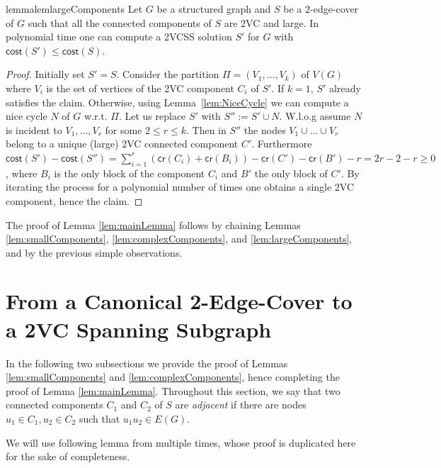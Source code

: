 \documentclass{theoretics}
\newcommand{\cost}{\mathsf{cost}}
\newcommand{\credit}{\mathsf{cr}}
\begin{document}
\begin{restatable}{lemma}{lemlargeComponents}\label{lem:largeComponents}
    Let $G$ be a structured graph and $S$ be a $2$-edge-cover of $G$ such that all the connected components of $S$ are 2VC and large. In polynomial time one can compute a 2VCSS solution $S'$ for $G$ with $\cost(S')\leq \cost(S)$.
\end{restatable}
\begin{proof}
    Initially set $S'=S$. Consider the partition $\Pi=(V_1,\ldots,V_k)$ of $V(G)$ where $V_i$ is the set of vertices of the 2VC component $C_i$ of $S'$. If $k=1$, $S'$ already satisfies the claim. Otherwise, using Lemma~\ref{lem:NiceCycle} we can compute a nice cycle $N$ of $G$ w.r.t. $\Pi$. Let us replace $S'$ with $S'':=S'\cup N$. W.l.o.g  assume $N$ is incident to $V_1,...,V_r$ for some $2\le r\le k$. Then in $S''$ the nodes   $V_1\cup \ldots \cup V_r$ belong to a unique (large) 2VC connected component $C'$. Furthermore $\cost(S')-\cost(S'')=\sum_{i=1}^r(\credit(C_i)+\credit(B_i))-\credit(C')-\credit(B')-r=2r-2-r\ge 0$, where $B_i$ is the only block of the component $C_i$ and $B'$ the only block of $C'$. By iterating the process for a polynomial number of times one obtains a single 2VC component, hence the claim.
\end{proof}

The proof of Lemma \ref{lem:mainLemma} follows by chaining Lemmas \ref{lem:smallComponents}, \ref{lem:complexComponents}, and \ref{lem:largeComponents}, and by the previous simple observations.

\section{From a Canonical 2-Edge-Cover to a 2VC Spanning Subgraph}
\label{sec:2VCSS}

In the following two subsections we provide the proof of Lemmas \ref{lem:smallComponents} and \ref{lem:complexComponents}, hence completing the proof of Lemma \ref{lem:mainLemma}. Throughout this section, we say that two connected components $C_1$ and $C_2$ of $S$ are \emph{adjacent} if there are nodes $u_1\in C_1, u_2\in C_2$ such that $u_1u_2\in E(G)$.

We will use following lemma from \cite{GGJ23} multiple times, whose proof is duplicated here for the sake of completeness.
\end{document}
